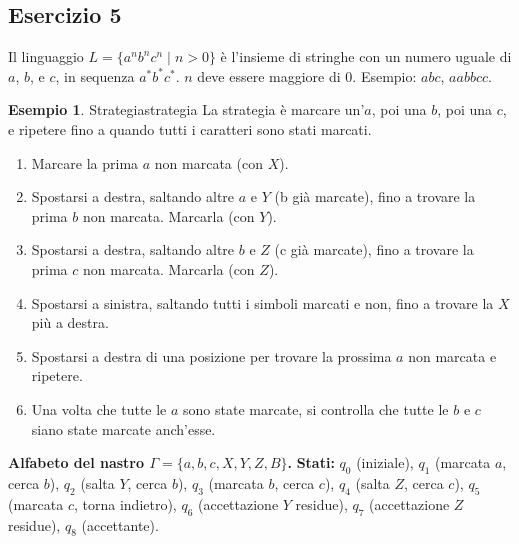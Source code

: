 \documentclass[a4paper]{article}
\theoremstyle{definition} %
\newtheorem{example}{Esempio}
\begin{document}
\subsection{Esercizio 5}
Il linguaggio $L = \{a^n b^n c^n \mid n > 0\}$ è l'insieme di stringhe con un numero uguale di $a$, $b$, e $c$, in sequenza $a^*b^*c^*$. $n$ deve essere maggiore di $0$. Esempio: $abc$, $aabbcc$.

\begin{example}{Strategia}{strategia}
La strategia è marcare un'$a$, poi una $b$, poi una $c$, e ripetere fino a quando tutti i caratteri sono stati marcati.
\begin{enumerate}
    \item Marcare la prima $a$ non marcata (con $X$).
    \item Spostarsi a destra, saltando altre $a$ e $Y$ (b già marcate), fino a trovare la prima $b$ non marcata. Marcarla (con $Y$).
    \item Spostarsi a destra, saltando altre $b$ e $Z$ (c già marcate), fino a trovare la prima $c$ non marcata. Marcarla (con $Z$).
    \item Spostarsi a sinistra, saltando tutti i simboli marcati e non, fino a trovare la $X$ più a destra.
    \item Spostarsi a destra di una posizione per trovare la prossima $a$ non marcata e ripetere.
    \item Una volta che tutte le $a$ sono state marcate, si controlla che tutte le $b$ e $c$ siano state marcate anch'esse.
\end{enumerate}
\end{example}

\noindent \textbf{Alfabeto del nastro $\Gamma = \{a, b, c, X, Y, Z, B\}$.}
\noindent \textbf{Stati:} $q_0$ (iniziale), $q_1$ (marcata $a$, cerca $b$), $q_2$ (salta $Y$, cerca $b$), $q_3$ (marcata $b$, cerca $c$), $q_4$ (salta $Z$, cerca $c$), $q_5$ (marcata $c$, torna indietro), $q_6$ (accettazione $Y$ residue), $q_7$ (accettazione $Z$ residue), $q_8$ (accettante).
\end{document}
